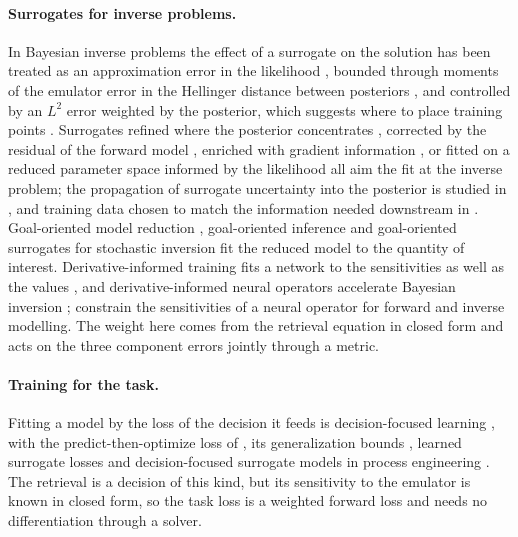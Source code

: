 \documentclass[11pt]{article}
\theoremstyle{remark}
\newcommand{\1}{\mathbf{1}}
\begin{document}
\paragraph{Surrogates for inverse problems.} In Bayesian inverse problems \cite{kaipiobook,stuart2010} the effect of a
surrogate on the solution has been treated as an approximation error in the likelihood \cite{kaipio}, bounded through
moments of the emulator error in the Hellinger distance between posteriors \cite{stuartteckentrup}, and controlled by an
$L^2$ error weighted by the posterior, which suggests where to place training points \cite{helin}. Surrogates refined
where the posterior concentrates \cite{limarzouk2014,cleary2021,gao2024uq}, corrected by the residual of the forward
model \cite{cao2023}, enriched with gradient information \cite{semler2024}, or fitted on a reduced parameter space
informed by the likelihood \cite{cui2014,cui2016,zahm2022} all aim the fit at the inverse problem; the propagation of
surrogate uncertainty into the posterior is studied in \cite{reiser2025}, and training data chosen to match the
information needed downstream in \cite{kurniawan2026}. Goal-oriented model reduction \cite{buithanh}, goal-oriented
inference \cite{lieberman2012,lieberman2014,spantini2017} and goal-oriented surrogates for stochastic inversion
\cite{mattis2018} fit the reduced model to the quantity of interest. Derivative-informed training fits a network to
the sensitivities as well as the values \cite{czarnecki,berguin2024}, and derivative-informed neural operators
\cite{oleary2022,oleary2024} accelerate Bayesian inversion \cite{cao2025}; \cite{behroozi} constrain the sensitivities
of a neural operator for forward and inverse modelling. The weight here comes from the retrieval equation in closed
form and acts on the three component errors jointly through a metric.

\paragraph{Training for the task.} Fitting a model by the loss of the decision it feeds is decision-focused learning
\cite{donti2017,wilder2019,mandi2024}, with the predict-then-optimize loss of \cite{elmachtoub2022}, its generalization
bounds \cite{elbalghiti2023}, learned surrogate losses \cite{shah2022} and decision-focused surrogate models in process
engineering \cite{gupta2024}. The retrieval is a decision of this kind, but its sensitivity to the emulator is known in
closed form, so the task loss is a weighted forward loss and needs no differentiation through a solver.
\end{document}
